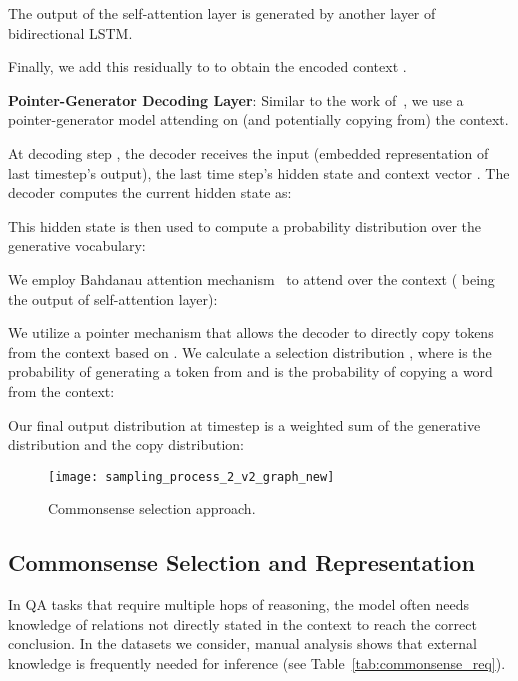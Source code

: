 \documentclass[11pt,a4paper]{article}
\def\tabref#1{Table~\ref{#1}}
\begin{document}
The output of the self-attention layer is generated by another layer of bidirectional LSTM. 

Finally, we add this residually to  to obtain the encoded context .

\noindent\textbf{Pointer-Generator Decoding Layer}: 
Similar to the work of~, we use a pointer-generator model attending on (and potentially copying from) the context.

At decoding step , 
the decoder receives the input  (embedded representation of last timestep's output), the last time step's hidden state  and context vector .
The decoder computes the current hidden state  as:

This hidden state is then used to compute a probability distribution over the generative vocabulary:


We employ Bahdanau attention mechanism~\cite{bahdanau2014neural} to attend over the context ( being the output of self-attention layer):




We utilize a pointer mechanism that allows the decoder to directly copy tokens from the context based on .
We calculate a selection distribution , where  is the probability of generating a token from  and  is the probability of copying a word from the context:



Our final output distribution at timestep  is a weighted sum of the generative distribution and the copy distribution:
\vspace{-3pt}

\vspace{-15pt} \begin{figure}[t]
\texttt{[image: sampling\_process\_2\_v2\_graph\_new]}
\caption{Commonsense selection approach.
}
\label{sampling_method}
\vspace{-10pt}
\end{figure} 
\subsection{Commonsense Selection and Representation}
\label{sec:commonsense}

In QA tasks that require multiple hops of reasoning, the model often needs knowledge of relations not directly stated in the context to reach the correct conclusion.
In the datasets we consider, manual analysis shows that external knowledge is frequently needed for inference (see \tabref{tab:commonsense_req}). 
\end{document}
